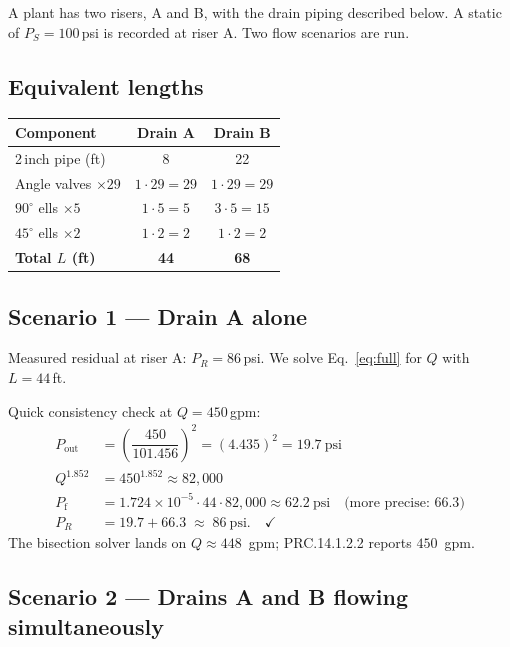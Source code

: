 \documentclass[11pt]{article}
\begin{document}
A plant has two risers, A and B, with the drain piping described below.
A static of $P_S = 100$\,psi is recorded at riser A. Two flow scenarios
are run.

\subsection*{Equivalent lengths}

\begin{center}
\begin{tabular}{lcc}
\toprule
Component & Drain A & Drain B \\
\midrule
2\,inch pipe (ft)        & 8                & 22 \\
Angle valves $\times 29$ & $1 \cdot 29 = 29$ & $1 \cdot 29 = 29$ \\
$90^\circ$ ells $\times 5$ & $1 \cdot 5 = 5$   & $3 \cdot 5 = 15$ \\
$45^\circ$ ells $\times 2$ & $1 \cdot 2 = 2$   & $1 \cdot 2 = 2$  \\
\midrule
\textbf{Total $L$ (ft)}  & \textbf{44}      & \textbf{68} \\
\bottomrule
\end{tabular}
\end{center}

\subsection*{Scenario 1 --- Drain A alone}

Measured residual at riser A: $P_R = 86$\,psi. We solve
Eq.~\eqref{eq:full} for $Q$ with $L = 44$\,ft.

Quick consistency check at $Q = 450$\,gpm:
\begin{align*}
P_{\text{out}} &= \left(\dfrac{450}{101.456}\right)^{2}
                = (4.435)^{2}
                = 19.7~\text{psi} \\[4pt]
Q^{1.852} &= 450^{1.852} \approx 82{,}000 \\[4pt]
P_{\text{f}}  &= 1.724\times10^{-5} \cdot 44 \cdot 82{,}000
                \approx 62.2~\text{psi}
                \quad\text{(more precise: } 66.3) \\[4pt]
P_R           &= 19.7 + 66.3 \;\approx\; 86~\text{psi.} \quad\checkmark
\end{align*}
The bisection solver lands on $Q \approx 448$~gpm; PRC.14.1.2.2 reports
$450$~gpm.

\subsection*{Scenario 2 --- Drains A and B flowing simultaneously}
\end{document}
